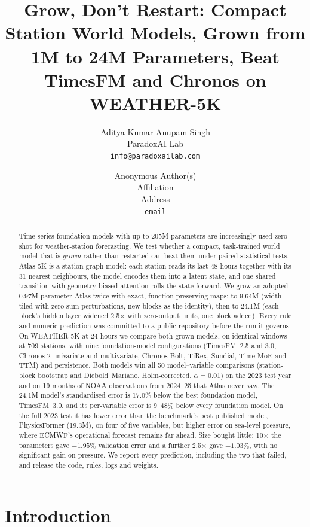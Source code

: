\documentclass{article}
\title{Grow, Don't Restart: Compact Station World Models, Grown from 1M to 24M Parameters, Beat TimesFM and Chronos on WEATHER-5K}
\author{%
  Aditya Kumar \qquad Anupam Singh\\
  ParadoxAI Lab\\
  \texttt{info@paradoxailab.com}
}
\author{Anonymous Author(s)\\Affiliation\\Address\\\texttt{email}}
\begin{document}
\maketitle

\begin{abstract}
Time-series foundation models with up to 205M parameters are increasingly used zero-shot for weather-station
forecasting. We test whether a compact, task-trained world model that is \emph{grown} rather than restarted can beat
them under paired statistical tests. Atlas-5K is a station-graph model: each station reads its last 48 hours together
with its 31 nearest neighbours, the model encodes them into a latent state, and one shared transition with
geometry-biased attention rolls the state forward. We grow an adopted 0.97M-parameter Atlas twice with exact,
function-preserving maps: to 9.64M (width tiled with zero-sum perturbations, new blocks as the identity), then to
24.1M (each block's hidden layer widened 2.5$\times$ with zero-output units, one block added). Every rule and numeric
prediction was committed to a public repository before the run it governs. On WEATHER-5K at 24 hours we compare both
grown models, on identical windows at 709 stations, with nine foundation-model configurations (TimesFM~2.5 and 3.0,
Chronos-2 univariate and multivariate, Chronos-Bolt, TiRex, Sundial, Time-MoE and TTM) and persistence. Both models win
all 50 model--variable comparisons (station-block bootstrap and Diebold--Mariano, Holm-corrected, $\alpha=0.01$) on the
2023 test year and on 19 months of NOAA observations from 2024--25 that Atlas never saw. The 24.1M model's standardised
error is 17.0\% below the best foundation model, TimesFM~3.0, and its per-variable error is 9--48\% below every
foundation model. On the full 2023 test it has lower error than the benchmark's best published model, PhysicsFormer
(19.3M), on four of five variables, but higher error on sea-level pressure, where ECMWF's operational forecast remains
far ahead. Size bought little: 10$\times$ the parameters gave $-1.95\%$ validation error and a further 2.5$\times$ gave
$-1.03\%$, with no significant gain on pressure. We report every prediction, including the two that failed, and
release the code, rules, logs and weights.
\end{abstract}

\section{Introduction}
\end{document}
